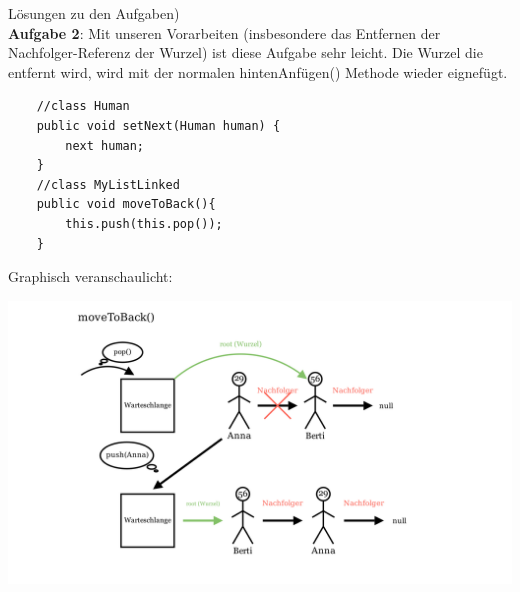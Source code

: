 \documentclass{article}
\begin{document}
Lösungen zu den Aufgaben)\\
\textbf{Aufgabe 2}:
Mit unseren Vorarbeiten (insbesondere das Entfernen der Nachfolger-Referenz der Wurzel) ist diese Aufgabe sehr leicht. 
Die Wurzel die entfernt wird, wird mit der normalen hintenAnfügen() Methode wieder eignefügt. 
\begin{verbatim}
    //class Human 
    public void setNext(Human human) {
        next human;
    }
    //class MyListLinked
    public void moveToBack(){
        this.push(this.pop());
    }
\end{verbatim}
Graphisch veranschaulicht:
\begin{center}
    \includegraphics[scale = 0.25]{../../media/linked_moveToBack.png}
\end{center}
\end{document}

